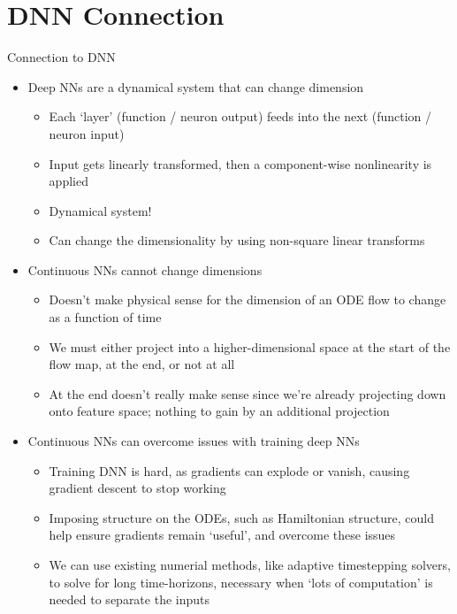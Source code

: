 \documentclass[presentation]{beamer}
\begin{document}
\section{DNN Connection}
\label{sec:org7a14b58}
\begin{frame}[label={sec:org021928d},plain]{Connection to DNN}
\begin{itemize}
\item Deep NNs are a dynamical system that can change dimension
\begin{itemize}
\item Each `layer' (function / neuron output) feeds into the next (function / neuron input)
\item Input gets linearly transformed, then a component-wise nonlinearity is applied
\item Dynamical system!
\item Can change the dimensionality by using non-square linear transforms
\end{itemize}

\item Continuous NNs cannot change dimensions
\begin{itemize}
\item Doesn't make physical sense for the dimension of an ODE flow to change as a function of time
\item We must either project into a higher-dimensional space at the start of the flow map, at the end, or not at all
\item At the end doesn't really make sense since we're already projecting down onto feature space; nothing to gain by an additional projection
\end{itemize}

\item Continuous NNs can overcome issues with training deep NNs
\begin{itemize}
\item Training DNN is hard, as gradients can explode or vanish, causing gradient descent to stop working
\item Imposing structure on the ODEs, such as Hamiltonian structure, could help ensure gradients remain `useful', and overcome these issues
\item We can use existing numerial methods, like adaptive timestepping solvers, to solve for long time-horizons, necessary when `lots of computation' is needed to separate the inputs
\end{itemize}
\end{itemize}
\end{frame}
\end{document}
